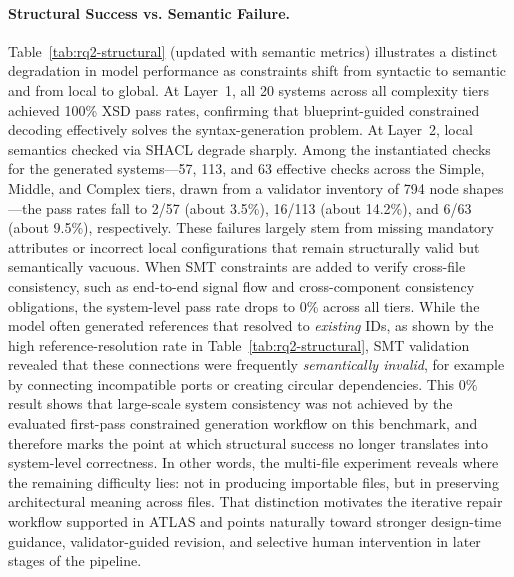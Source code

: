 \documentclass[acmlarge,nonacm]{acmart}
\theoremstyle{acmplain}
\theoremstyle{acmdefinition}
\begin{document}
\paragraph{Structural Success vs. Semantic Failure.}
Table~\ref{tab:rq2-structural} (updated with semantic metrics) illustrates a distinct degradation in model performance as constraints shift from syntactic to semantic and from local to global.
At Layer~1, all 20 systems across all complexity tiers achieved 100\% XSD pass rates, confirming that blueprint-guided constrained decoding effectively solves the syntax-generation problem.
At Layer~2, local semantics checked via SHACL degrade sharply. Among the instantiated checks for the generated systems---57, 113, and 63 effective checks across the Simple, Middle, and Complex tiers, drawn from a validator inventory of 794 node shapes---the pass rates fall to 2/57 (about 3.5\%), 16/113 (about 14.2\%), and 6/63 (about 9.5\%), respectively. These failures largely stem from missing mandatory attributes or incorrect local configurations that remain structurally valid but semantically vacuous.
When SMT constraints are added to verify cross-file consistency, such as end-to-end signal flow and cross-component consistency obligations, the system-level pass rate drops to 0\% across all tiers.
While the model often generated references that resolved to \emph{existing} IDs, as shown by the high reference-resolution rate in Table~\ref{tab:rq2-structural}, SMT validation revealed that these connections were frequently \emph{semantically invalid}, for example by connecting incompatible ports or creating circular dependencies.
This 0\% result shows that large-scale system consistency was not achieved by the evaluated first-pass constrained generation workflow on this benchmark, and therefore marks the point at which structural success no longer translates into system-level correctness. In other words, the multi-file experiment reveals where the remaining difficulty lies: not in producing importable files, but in preserving architectural meaning across files. That distinction motivates the iterative repair workflow supported in ATLAS and points naturally toward stronger design-time guidance, validator-guided revision, and selective human intervention in later stages of the pipeline.
\end{document}
